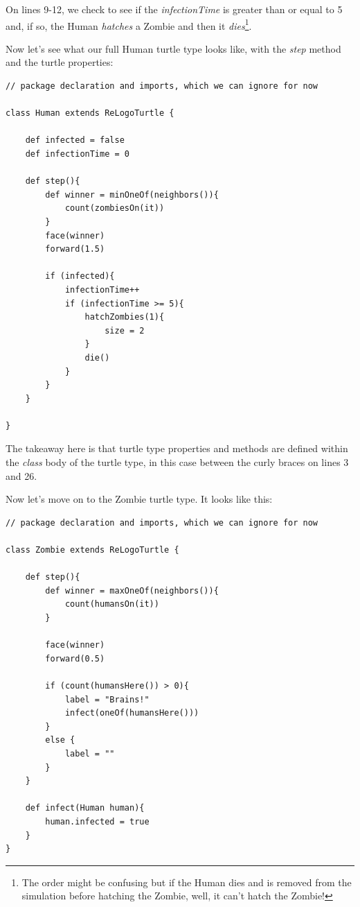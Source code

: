 \documentclass[11pt]{amsart}
\begin{document}
On lines 9-12, we check to see if the \emph{infectionTime} is greater than or equal to 5 and, if so, the Human \emph{hatches} a Zombie and then it \emph{dies}\footnote{The order might be confusing but if the Human dies and is removed from the simulation before hatching the Zombie, well, it can't hatch the Zombie!}.

Now let's see what our full Human turtle type looks like, with the \emph{step} method and the turtle properties:

\noindent\begin{minipage}[h]{\textwidth}
\vspace{.2in}
\lstset{language=java,caption=The Human turtle type.,label=lst:humantype}
\begin{lstlisting}
// package declaration and imports, which we can ignore for now

class Human extends ReLogoTurtle {
	
	def infected = false
	def infectionTime = 0
	
	def step(){
		def winner = minOneOf(neighbors()){
			count(zombiesOn(it))
		}
		face(winner)
		forward(1.5)
		
		if (infected){
			infectionTime++
			if (infectionTime >= 5){
				hatchZombies(1){
					size = 2
				}
				die()
			}
		}
	}
	
}
\end{lstlisting}
\vspace{.2in}
\end{minipage}

The takeaway here is that turtle type properties and methods are defined within the \emph{class} body of the turtle type, in this case between the curly braces on lines 3 and 26.

Now let's move on to the Zombie turtle type. It looks like this:

\noindent\begin{minipage}[h]{\textwidth}
\vspace{.2in}
\lstset{language=java,caption=The Zombie turtle type.,label=lst:zombietype}
\begin{lstlisting}
// package declaration and imports, which we can ignore for now

class Zombie extends ReLogoTurtle {

	def step(){
		def winner = maxOneOf(neighbors()){
			count(humansOn(it))
		}
		
		face(winner)
		forward(0.5)
		
		if (count(humansHere()) > 0){
			label = "Brains!"
			infect(oneOf(humansHere()))
		}
		else {
			label = ""
		}
	}
	
	def infect(Human human){
		human.infected = true
	}
}
\end{lstlisting}
\vspace{.2in}
\end{minipage}
\end{document}
